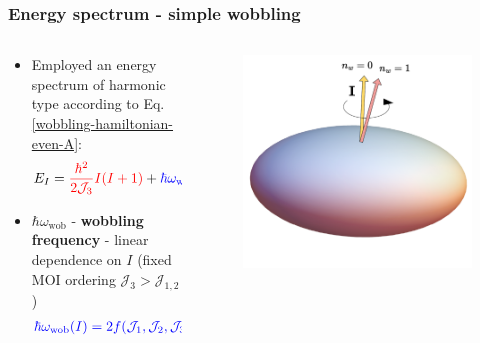 \documentclass{beamer}
\begin{document}
\begin{frame}
  \frametitle{Energy spectrum - simple wobbling}
  \begin{columns}
    \begin{column}{0.65\textwidth}
        \begin{itemize}
          \item Employed an energy spectrum of harmonic type according to Eq. \ref{wobbling-hamiltonian-even-A}:
          \begin{align}
            E_{I}={\color{red}\frac{\hbar^2}{2\mathcal{J}_3}I(I+1)}+{\color{blue}\hbar\omega_\text{wob}\left(n_w+\frac{1}{2}\right)}\nonumber
          \end{align}
          \item $\hbar\omega_\text{wob}$ - \textbf{wobbling frequency} - linear dependence on $I$ (fixed MOI ordering $\mathcal{J}_3>\mathcal{J}_{1,2}$)
          \begin{align}
            {\color{blue}\hbar\omega_\text{wob}(I)=2f(\mathcal{J}_1,\mathcal{J}_2,\mathcal{J}_3)\cdot I}\nonumber
          \end{align}
        \end{itemize}
    \end{column}
    \begin{column}{0.4\textwidth}
      \begin{figure}
        \begin{center}
          \includegraphics[scale=0.21]{Figs/triaxial-shapes-even-A.pdf}
        \end{center}
      \end{figure}
    \end{column}
  \end{columns}
\end{frame}
\end{document}
